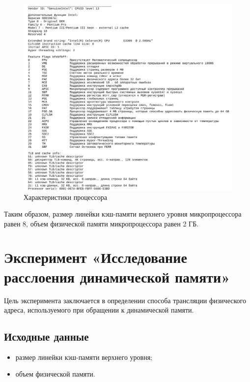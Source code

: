 \begin{figure}[H]
	\begin{center}
		\includegraphics[scale=0.3]{img/params.png}
	\end{center}
	\captionsetup{justification=centering}
	\caption{Характеристики процессора}
	\label{img:params}
\end{figure}

Таким образом, размер линейки кэш-памяти верхнего уровня микропроцессора равен 8, объем физической памяти микропроцессора равен 2 ГБ.

\chapter{Эксперимент «Исследование расслоения динамической памяти»}

Цель эксперимента заключается в определении способа трансляции физического адреса, используемого при обращении к динамической памяти.

\section{Исходные данные}

\begin{itemize}
	\item размер линейки кэш-памяти верхнего уровня;
	\item объем физической памяти.
\end{itemize}

